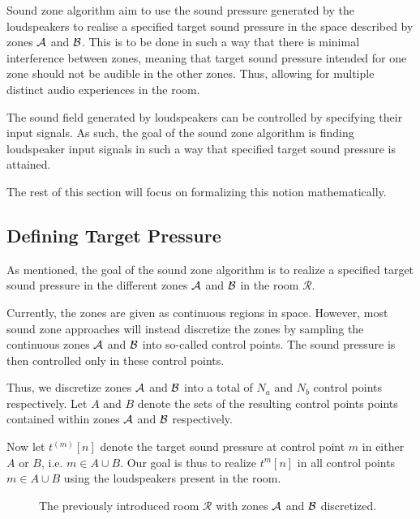 Sound zone algorithm aim to use the sound pressure generated by the loudspeakers to realise a specified target sound pressure
in the space described by zones $\mathcal{A}$ and $\mathcal{B}$.
This is to be done in such a way that there is minimal interference between zones, 
meaning that target sound pressure intended for one zone should not be audible in the other zones.
Thus, allowing for multiple distinct audio experiences in the room.

The sound field generated by loudspeakers can be controlled by specifying their input signals.
As such, the goal of the sound zone algorithm is finding loudspeaker input signals in such a way that 
specified target sound pressure is attained.

The rest of this section will focus on formalizing this notion mathematically.

\subsection{Defining Target Pressure}
\label{ch:sound_zone:data_model:target_pressure}
As mentioned, the goal of the sound zone algorithm is to realize a specified target sound pressure
in the different zones $\mathcal{A}$ and $\mathcal{B}$ in the room $\mathcal{R}$.

Currently, the zones are given as continuous regions in space.
However, most sound zone approaches will instead discretize the zones by sampling the continuous zones 
$\mathcal{A}$ and $\mathcal{B}$ into so-called control points.
The sound pressure is then controlled only in these control points.

Thus, we discretize zones $\mathcal{A}$ and $\mathcal{B}$ into a total of $N_a$ and $N_b$ control points respectively.   
Let $A$ and $B$ denote the sets of the resulting control points points contained within zones $\mathcal{A}$ and $\mathcal{B}$ respectively.

Now let $t^{(m)}[n]$ denote the target sound pressure at control point $m$ in either $A$ or $B$, i.e. $m\in A \cup B$.
Our goal is thus to realize $t^{m}[n]$ in all control points $m\in A \cup B$ using the loudspeakers present in the room.

\begin{figure}
    \centering
    
    \caption{The previously introduced room $\mathcal{R}$ with zones $\mathcal{A}$ and $\mathcal{B}$ discretized.}
\end{figure}

